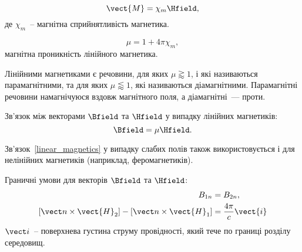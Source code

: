 \begin{Theory}
  \begin{equation}
	  \vect{M} = \chi_m\Hfield,
  \end{equation}
  де $\chi_m$~-- магнітна сприйнятливість магнетика.

  \begin{equation}
	  \mu = 1 + 4\pi\chi_m,
  \end{equation}
  магнітна проникність лінійного магнетика.

  Лінійними магнетиками є речовини, для яких $\mu \gtrapprox 1$, і які називаються  парамагнітними, та для яких $\mu \lessapprox 1$, які називаються діамагнітними. Парамагнітні речовини намагнічуюся вздовж магнітного поля, а діамагнітні~--- проти.

	Зв'язок між векторами  $\Bfield$ та $\Hfield$ у випадку лінійних магнетиків:
	\begin{equation}\label{linear_magnetics}
		\Bfield = \mu \Hfield.
	\end{equation}

	Зв'язок~\ref{linear_magnetics} у випадку слабих полів також використовується і для нелінійних магнетиків (наприклад, феромагнетиків).


  Граничні умови для векторів $\Bfield$ та $\Hfield$:
  \begin{align}
	  B_{1n}                & = B_{2n},         \label{B_boundary}\\
	  \left[ \vect n \times \vect{H}_{2}\right]  - \left[ \vect n \times \vect{H}_{1}\right]  & = \frac{4\pi}{c}\vect{i} \label{H_boundary}
  \end{align}
  $\vect i$~-- поверхнева густина струму провідності, який тече по границі розділу середовищ.
\end{Theory}


%

